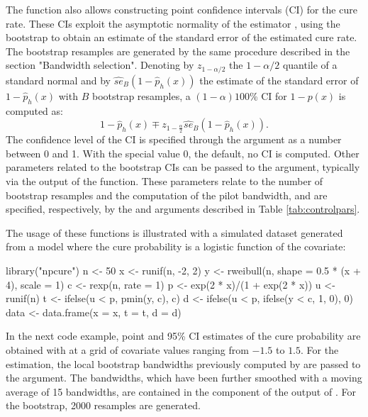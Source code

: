 The function  also allows constructing point confidence intervals (CI) for the cure rate. These CIs exploit the asymptotic normality of the estimator \citep{Xu}, using the bootstrap to obtain an estimate of the standard error of the estimated cure rate. The bootstrap resamples are generated by the same procedure described in the section "Bandwidth selection". Denoting by $z_{1-\alpha/2}$ the $1-\alpha/2$ quantile of a standard normal and by $\widehat{se}_B\left(1-\hat{p}_h(x)\right)$ the estimate of the standard error of $1-\hat{p}_h(x)$ with $B$ bootstrap resamples, a $\left(1-\alpha \right)100$\% CI for $1-p(x)$ is computed as:
\begin{equation}
1-\hat{p}_h(x) \mp z_{1-\frac{\alpha}{2}}\widehat{se}_B\left(1-\hat{p}_h(x)\right).
\end{equation}
The confidence level of the CI is specified through the  argument as a number between 0 and 1. With the special value 0, the default, no CI is computed. Other parameters related to the bootstrap CIs can be passed to the  argument, typically via the output of the  function. These parameters relate to the number of bootstrap resamples and the computation of the pilot bandwidth, and are specified, respectively, by the  and  arguments described in Table \ref{tab:controlpars}.

The usage of these functions is illustrated with a simulated dataset generated from a model where the cure probability is a logistic function of the covariate:

\begin{example}
library("npcure")
n <- 50
x <- runif(n, -2, 2)
y <- rweibull(n, shape = 0.5 * (x + 4), scale = 1)
c <- rexp(n, rate = 1)
p <- exp(2 * x)/(1 + exp(2 * x))
u <- runif(n)
t <- ifelse(u < p, pmin(y, c), c)
d <- ifelse(u < p, ifelse(y < c, 1, 0), 0)
data <- data.frame(x = x, t = t, d = d)
\end{example}

In the next code example, point and 95\% CI estimates of the cure probability are obtained with  at a grid of covariate values ranging from $-1.5$ to $1.5$. For the estimation, the local bootstrap bandwidths previously computed by  are passed to the  argument. The bandwidths, which have been further smoothed with a moving average of 15 bandwidths, are contained in the  component of the output of . For the bootstrap, 2000 resamples are generated.

